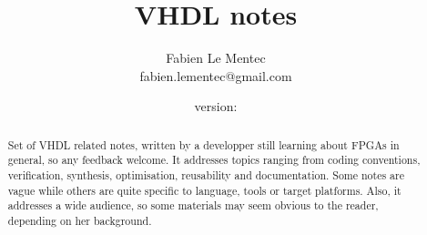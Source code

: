 \documentclass[12pt]{article}
\begin{document}

\newcommand{\note}[1]
{\newpage\section{#1}\label{note:#1}}

\newcommand{\topics}[1]
{\paragraph{}\small{\textit{topics: #1}}}

\newcommand{\related}[1]
{\paragraph{}\small{\textit{related notes: \ref{note:#1}}}}

\newcommand{\todo}[1]
{\paragraph{}\textbf{TODO}: #1}

{\newline\lstset{language=VHDL, frame=single}}{}

{\newline\lstset{frame=single}}{}

\newcommand{\longurl}[2]
{\url{#1#2}}

\newcommand{\longlongurl}[3]
{\url{#1#2#3}}




\title{VHDL notes}
\author{Fabien Le Mentec \\ fabien.lementec@gmail.com}

{}{\newcommand{\version}{none}}
\date{\small{version: \version}}

\maketitle

\begin{abstract}
Set of VHDL related notes, written by a developper still learning
about FPGAs in general, so any feedback welcome. It addresses topics
ranging from coding conventions, verification, synthesis, optimisation,
reusability and documentation. Some notes are vague while others are
quite specific to language, tools or target platforms. Also, it addresses
a wide audience, so some materials may seem obvious to the reader,
depending on her background.
\end{abstract}
\end{document}
